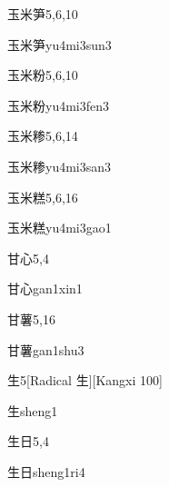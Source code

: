 \begin{entry}{玉米笋}{5,6,10}
  \begin{phonetics}{玉米笋}{yu4mi3sun3}
  \end{phonetics}
\end{entry}

\begin{entry}{玉米粉}{5,6,10}
  \begin{phonetics}{玉米粉}{yu4mi3fen3}
  \end{phonetics}
\end{entry}

\begin{entry}{玉米糁}{5,6,14}
  \begin{phonetics}{玉米糁}{yu4mi3san3}
  \end{phonetics}
\end{entry}

\begin{entry}{玉米糕}{5,6,16}
  \begin{phonetics}{玉米糕}{yu4mi3gao1}
  \end{phonetics}
\end{entry}

\begin{entry}{甘心}{5,4}
  \begin{phonetics}{甘心}{gan1xin1}
  \end{phonetics}
\end{entry}

\begin{entry}{甘薯}{5,16}
  \begin{phonetics}{甘薯}{gan1shu3}
  \end{phonetics}
\end{entry}

\begin{entry}{生}{5}[Radical 生][Kangxi 100]
  \begin{phonetics}{生}{sheng1}
  \end{phonetics}
\end{entry}

\begin{entry}{生日}{5,4}
  \begin{phonetics}{生日}{sheng1ri4}
  \end{phonetics}
\end{entry}

